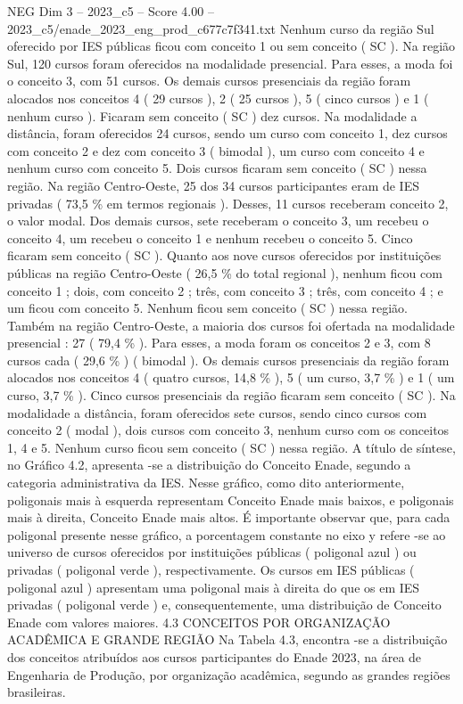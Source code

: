 \begin{textsample}{NEG Dim 3 – 2023\_c5 – Score 4.00 – 2023\_c5/enade\_2023\_eng\_prod\_c677c7f341.txt}
Nenhum curso da região Sul oferecido por IES públicas ficou com conceito 1 ou sem conceito ( SC ).
Na região Sul, 120 cursos foram oferecidos na modalidade presencial.
Para esses, a moda foi o conceito 3, com 51 cursos.
Os demais cursos presenciais da região foram alocados nos conceitos 4 ( 29 cursos ), 2 ( 25 cursos ), 5 ( cinco cursos ) e 1 ( nenhum curso ).
Ficaram sem conceito ( SC ) dez cursos.
Na modalidade a distância, foram oferecidos 24 cursos, sendo um curso com conceito 1, dez cursos com conceito 2 e dez com conceito 3 ( bimodal ), um curso com conceito 4 e nenhum curso com conceito 5.
Dois cursos ficaram sem conceito ( SC ) nessa região.
Na região Centro-Oeste, 25 dos 34 cursos participantes eram de IES privadas ( 73,5 \% em termos regionais ).
Desses, 11 cursos receberam conceito 2, o valor modal.
Dos demais cursos, sete receberam o conceito 3, um recebeu o conceito 4, um recebeu o conceito 1 e nenhum recebeu o conceito 5.
Cinco ficaram sem conceito ( SC ).
Quanto aos nove cursos oferecidos por instituições públicas na região Centro-Oeste ( 26,5 \% do total regional ), nenhum ficou com conceito 1 ; dois, com conceito 2 ; três, com conceito 3 ; três, com conceito 4 ; e um ficou com conceito 5.
Nenhum ficou sem conceito ( SC ) nessa região.
Também na região Centro-Oeste, a maioria dos cursos foi ofertada na modalidade presencial : 27 ( 79,4 \% ).
Para esses, a moda foram os conceitos 2 e 3, com 8 cursos cada ( 29,6 \% ) ( bimodal ).
Os demais cursos presenciais da região foram alocados nos conceitos 4 ( quatro cursos, 14,8 \% ), 5 ( um curso, 3,7 \% ) e 1 ( um curso, 3,7 \% ).
Cinco cursos presenciais da região ficaram sem conceito ( SC ).
Na modalidade a distância, foram oferecidos sete cursos, sendo cinco cursos com conceito 2 ( modal ), dois cursos com conceito 3, nenhum curso com os conceitos 1, 4 e 5.
Nenhum curso ficou sem conceito ( SC ) nessa região.
A título de síntese, no Gráfico 4.2, apresenta -se a distribuição do Conceito Enade, segundo a categoria administrativa da IES.
Nesse gráfico, como dito anteriormente, poligonais mais à esquerda representam Conceito Enade mais baixos, e poligonais mais à direita, Conceito Enade mais altos.
É importante observar que, para cada poligonal presente nesse gráfico, a porcentagem constante no eixo y refere -se ao universo de cursos oferecidos por instituições públicas ( poligonal azul ) ou privadas ( poligonal verde ), respectivamente.
Os cursos em IES públicas ( poligonal azul ) apresentam uma poligonal mais à direita do que os em IES privadas ( poligonal verde ) e, consequentemente, uma distribuição de Conceito Enade com valores maiores. 4.3 CONCEITOS POR ORGANIZAÇÃO ACADÊMICA E GRANDE REGIÃO Na Tabela 4.3, encontra -se a distribuição dos conceitos atribuídos aos cursos participantes do Enade 2023, na área de Engenharia de Produção, por organização acadêmica, segundo as grandes regiões brasileiras.

\end{textsample}

